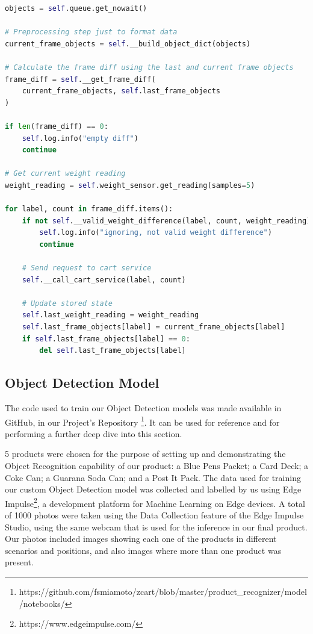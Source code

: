 \documentclass[openright]{normas-utf-tex} %
\begin{document}
\begin{lstlisting}[language=Python,caption={Product Recognizer thread logic}]
objects = self.queue.get_nowait()

# Preprocessing step just to format data
current_frame_objects = self.__build_object_dict(objects)

# Calculate the frame diff using the last and current frame objects
frame_diff = self.__get_frame_diff(
    current_frame_objects, self.last_frame_objects
)

if len(frame_diff) == 0:
    self.log.info("empty diff")
    continue

# Get current weight reading
weight_reading = self.weight_sensor.get_reading(samples=5)

for label, count in frame_diff.items():
    if not self.__valid_weight_difference(label, count, weight_reading):
        self.log.info("ignoring, not valid weight difference")
        continue

    # Send request to cart service
    self.__call_cart_service(label, count)

    # Update stored state
    self.last_weight_reading = weight_reading
    self.last_frame_objects[label] = current_frame_objects[label]
    if self.last_frame_objects[label] == 0:
        del self.last_frame_objects[label]
\end{lstlisting}

\subsection{Object Detection Model}

The code used to train our Object Detection models was made available in GitHub,
in our Project's Repository
\footnote{https://github.com/fsmiamoto/zcart/blob/master/product\_recognizer/model/notebooks/}.
It can be used for reference and for performing a further deep dive into this section.

5 products were chosen for the purpose of setting up and demonstrating the Object Recognition 
capability of our product: a Blue Pens Packet; a Card Deck; a Coke Can; a Guarana Soda Can; 
and a Post It Pack. 
The data used for training our custom Object Detection model was collected and labelled by us
using Edge Impulse\footnote{https://www.edgeimpulse.com/}, a development platform for Machine 
Learning on Edge devices.
A total of 1000 photos were taken using the Data Collection feature of the Edge Impulse Studio,
using the same webcam that is used for the inference in our final product.
Our photos included images showing each one of the products in different scenarios and positions, 
and also images where more than one product was present.
\end{document}
